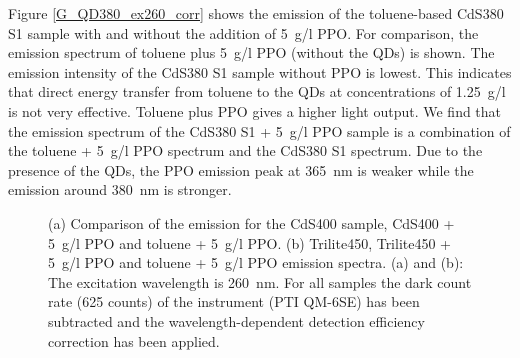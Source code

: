 \documentclass[cits]{JINST}
\begin{document}
Figure \ref{G_QD380_ex260_corr} shows the emission of the toluene-based CdS380 S1 sample with and without the addition of 5~g/l PPO. For comparison, the emission spectrum of toluene plus 5~g/l PPO (without the QDs) is shown. The emission intensity of the CdS380 S1 sample without PPO is lowest. This indicates that direct energy transfer from toluene to the QDs at concentrations of 1.25~g/l is not very effective. Toluene plus PPO gives a higher light output. We find that the emission spectrum of the CdS380 S1 + 5~g/l PPO sample is a combination of the toluene + 5~g/l PPO spectrum and the CdS380 S1 spectrum. Due to the presence of the QDs, the PPO emission peak at 365~nm is weaker while the emission around 380~nm is stronger.  

\begin{figure}
      \begin{center}
\caption[]{(a) Comparison of the emission for the CdS400 sample, CdS400 + 5~g/l PPO and toluene + 5~g/l PPO. (b) Trilite450, Trilite450 + 5~g/l PPO and toluene + 5~g/l PPO emission spectra. (a) and (b): The excitation wavelength is 260~nm. For all samples the dark count rate (625 counts) of the instrument (PTI QM-6SE) has been subtracted and the wavelength-dependent detection efficiency correction has been applied. \label{G_QD400_QD450_ex260_corr}}
        \end{center}
\end{figure}
\end{document}
